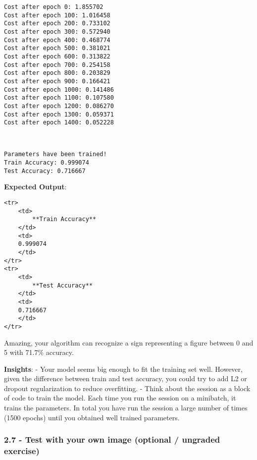 \documentclass[11pt]{article}
\begin{document}
    \begin{Verbatim}[commandchars=\\\{\}]
Cost after epoch 0: 1.855702
Cost after epoch 100: 1.016458
Cost after epoch 200: 0.733102
Cost after epoch 300: 0.572940
Cost after epoch 400: 0.468774
Cost after epoch 500: 0.381021
Cost after epoch 600: 0.313822
Cost after epoch 700: 0.254158
Cost after epoch 800: 0.203829
Cost after epoch 900: 0.166421
Cost after epoch 1000: 0.141486
Cost after epoch 1100: 0.107580
Cost after epoch 1200: 0.086270
Cost after epoch 1300: 0.059371
Cost after epoch 1400: 0.052228

    \end{Verbatim}

    \begin{center}
    \end{center}
    { \hspace*{\fill} \\}
    
    \begin{Verbatim}[commandchars=\\\{\}]
Parameters have been trained!
Train Accuracy: 0.999074
Test Accuracy: 0.716667

    \end{Verbatim}

    \textbf{Expected Output}:

\begin{verbatim}
<tr> 
    <td>
        **Train Accuracy**
    </td>
    <td>
    0.999074
    </td>
</tr>
<tr> 
    <td>
        **Test Accuracy**
    </td>
    <td>
    0.716667
    </td>
</tr>
\end{verbatim}

Amazing, your algorithm can recognize a sign representing a figure
between 0 and 5 with 71.7\% accuracy.

\textbf{Insights}: - Your model seems big enough to fit the training set
well. However, given the difference between train and test accuracy, you
could try to add L2 or dropout regularization to reduce overfitting. -
Think about the session as a block of code to train the model. Each time
you run the session on a minibatch, it trains the parameters. In total
you have run the session a large number of times (1500 epochs) until you
obtained well trained parameters.

    \subsubsection{2.7 - Test with your own image (optional / ungraded
exercise)}\label{test-with-your-own-image-optional-ungraded-exercise}
\end{document}

